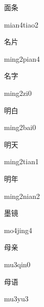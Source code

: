 \begin{verbete}{面条}
\begin{pronuncia}{mian4tiao2}
\end{pronuncia}
\end{verbete}

\begin{verbete}{名片}
\begin{pronuncia}{ming2pian4}
\end{pronuncia}
\end{verbete}

\begin{verbete}[ming2zi0]{名字}
\begin{pronuncia}{ming2zi0}
\end{pronuncia}
\end{verbete}

\begin{verbete}{明白}
\begin{pronuncia}{ming2bai0}
\end{pronuncia}
\end{verbete}

\begin{verbete}{明天}
\begin{pronuncia}{ming2tian1}
\end{pronuncia}
\end{verbete}

\begin{verbete}{明年}
\begin{pronuncia}{ming2nian2}
\end{pronuncia}
\end{verbete}

\begin{verbete}[mo4jing4]{墨镜}
\begin{pronuncia}{mo4jing4}
\end{pronuncia}
\end{verbete}

\begin{verbete}[mu3qin0]{母亲}
\begin{pronuncia}{mu3qin0}
\end{pronuncia}
\end{verbete}                                                                     

\begin{verbete}[mu3yu3]{母语}                                               
\begin{pronuncia}{mu3yu3}
\end{pronuncia}
\end{verbete}                                                                     

